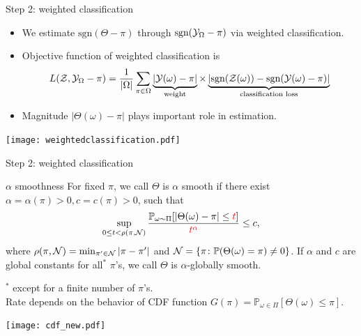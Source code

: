 \documentclass[10pt, mathserif]{beamer} %
\theoremstyle{definition}
\theoremstyle{plain}
\begin{document}
\begin{frame}{Step 2: weighted classification}
    \begin{itemize}
    \item We estimate $\text{sgn}(\Theta-\pi)$ through $\text{sgn}(\mathcal{Y}_\Omega-\pi)$ via weighted classification.
    \item Objective function of weighted classification is
    \begin{align}
    L(\mathcal{Z},\mathcal{Y}_\Omega-\pi) = \frac{1}{|\Omega|}\sum_{\pi\in\Omega}\underbrace{|\mathcal{Y}(\omega)-\pi|}_{\text{weight}}\times\underbrace{ |\text{sgn}(\mathcal{Z}(\omega))-\text{sgn}(\mathcal{Y}(\omega)-\pi)|}_{\text{classification loss}}
    \end{align}
    \item Magnitude $|\Theta(\omega)-\pi|$ plays important role in estimation.
    \end{itemize}
       \begin{center}
    \texttt{[image: weightedclassification.pdf]}
    \end{center}
\end{frame}


\begin{frame}{Step 2: weighted classification}
\begin{block}{$\alpha$ smoothness}
For fixed $\pi$, we call $\Theta$ is $\alpha$ smooth if there exist $\alpha = \alpha(\pi)>0,c = c(\pi)>0$, such that 
\begin{align}
    \sup_{0\leq t<\rho(\pi,\mathcal{N})}{\mathbb{P}_{\omega\sim\Pi}[|\Theta(\omega)-\pi|\leq{ \color{red}t}]\over{\color{red} t^\alpha}}\leq c,
\end{align}
where $\rho(\pi,\mathcal{N}) = \min_{\pi'\in\mathcal{N}}|\pi-\pi'|$ and $\mathcal{N} = \{\pi\colon\mathbb{P}(\Theta(\omega) = \pi)\neq 0\}$.
If $\alpha$ and $c$ are global constants for all$^*$ $\pi$'s, we call $\Theta$ is $\alpha$-globally smooth.
\end{block} \vspace{-.4cm}
 {\hfill \tiny $^*$ except for a finite number of $\pi$'s. }\\
 Rate depends on the behavior of CDF function $G(\pi) = \mathbb{P}_{\omega\in\Pi}[\Theta(\omega)\leq\pi].$
 \begin{center}
 \texttt{[image: cdf\_new.pdf]}
 \end{center}
\end{frame}
\end{document}
